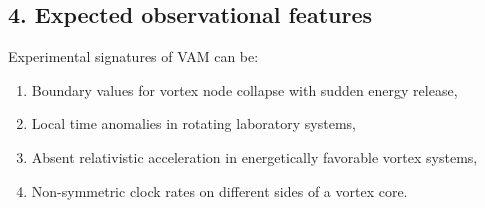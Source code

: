 \subsection{4. Expected observational features}

Experimental signatures of VAM can be:
\begin{enumerate}
    \item Boundary values ​​for vortex node collapse with sudden energy release,
    \item Local time anomalies in rotating laboratory systems,
    \item Absent relativistic acceleration in energetically favorable vortex systems,
    \item Non-symmetric clock rates on different sides of a vortex core.
\end{enumerate}